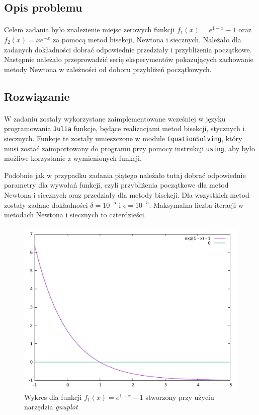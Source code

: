\documentclass[a4paper]{article}
\begin{document}
\subsection{Opis problemu}
\paragraph{}
Celem zadania było znalezienie miejsc zerowych funkcji $f_{1}(x) = e^{1 - x} - 1$ oraz $f_{2}(x) = xe^{-x}$ za pomocą metod bisekcji, Newtona i siecznych. Należało dla zadanych dokładności dobrać odpowiednie przedziały i przybliżenia początkowe. Następnie należało przeprowadzić serię eksperymentów pokazujących zachowanie metody Newtona w zależności od doboru przybliżeń początkowych.

\subsection{Rozwiązanie}
\paragraph{}
W zadaniu zostały wykorzystane zaimplementowane wcześniej w języku programowania \texttt{Julia} funkcje, będące realizacjami metod bisekcji, stycznych i siecznych. Funkcje te zostały umieszczone w module \texttt{EquationSolving}, który musi zostać zaimportowany do programu przy pomocy instrukcji \texttt{using}, aby było możliwe korzystanie z wymienionych funkcji.

Podobnie jak w przypadku zadania piątego należało tutaj dobrać odpowiednie parametry dla wywołań funkcji, czyli przybliżenia początkowe dla metod Newtona i siecznych oraz przedziały dla metody bisekcji. Dla wszystkich metod zostały zadane dokładności $\delta = 10^{-5}$ i $\epsilon = 10^{-5}$. Maksymalna liczba iteracji w metodach Newtona i siecznych to czterdzieści.

\paragraph{}
\begin{figure}[htbp]
  \centering
  \includegraphics[scale=0.35]{wykres6a.pdf}
  \caption{Wykres dla funkcji $f_{1}(x) = e^{1 - x} - 1$ stworzony przy użyciu narzędzia \textit{gnuplot}}
\end{figure}
\clearpage
\end{document}
